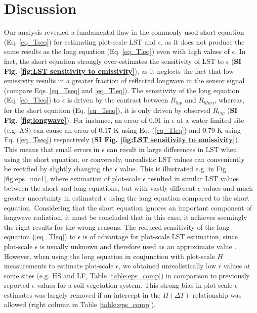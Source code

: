\documentclass[fleqn,10pt]{wlscirep}
\begin{document}
{{\section{Discussion}
Our analysis revealed a fundamental flaw in the commonly used short equation (Eq. \ref{eq_Tseq}) for estimating plot-scale LST and $\epsilon$, as it does not produce the same results as the long equation (Eq. \ref{eq_Tleq}) even with high values of $\epsilon$. In fact, the short equation strongly over-estimates the sensitivity of LST to $\epsilon$ (\textbf{SI Fig. \ref{fig:LST sensitivity to emissivity}}), as it neglects the fact that low emissivity results in a greater fraction of reflected longwave in the sensor signal (compare Eqs. \ref{eq_Tseq} and \ref{eq_Tleq}). The sensitivity of the long equation (Eq. \ref{eq_Tleq}) to $\epsilon$ is driven by the contrast between $R_{lup}$ and $R_{ldwn}$, whereas, for the short equation (Eq. \ref{eq_Tseq}), it is only driven by observed $R_{lup}$ (\textbf{SI Fig. \ref{fig:longwave}}). For instance, an error of 0.01 in $\epsilon$ at a water-limited site (e.g. AS) can cause an error of 0.17 K using Eq. (\ref{eq_Tleq}) and 0.79 K using Eq. (\ref{eq_Tseq}) respectively (\textbf{SI Fig. \ref{fig:LST sensitivity to emissivity}}). This means that small errors in $\epsilon$ can result in large differences in LST when using the short equation, or conversely, unrealistic LST values can conveniently be rectified by slightly changing the $\epsilon$ value. 
This is illustrated e.g. in Fig. \ref{fig:eps_unc1}, where estimation of plot-scale $\epsilon$ resulted in similar LST values between the short and long equations, but with vastly different $\epsilon$ values and much greater uncertainty in estimated $\epsilon$ using the long equation compared to the short equation. Considering that the short equation ignores an important component of longwave radiation, it must be concluded that in this case, it achieves seemingly the right results for the wrong reasons. The reduced sensitivity of the long equation (\ref{eq_Tleq}) to $\epsilon$ is of advantage for plot-scale LST estimation, since plot-scale $\epsilon$ is usually unknown and therefore used as an approximate value \cite{mallick2018bridging}. However, when using the long equation in conjunction with plot-scale $H$ measurements to estimate plot-scale $\epsilon$, we obtained unrealistically low $\epsilon$ values at some sites (e.g. HS and LF, Table \ref{table:eps_comp}) in comparison to previously reported  $\epsilon$ values for a soil-vegetation system\cite{sugita1996optimal,snyder1998classification}. This strong bias in plot-scale $\epsilon$ estimates was largely removed if an intercept in the $H(\Delta T)$ relationship was allowed (right column in Table \ref{table:eps_comp}). 
}}
\end{document}
